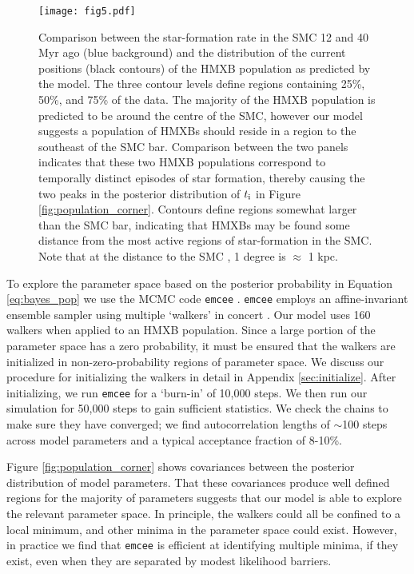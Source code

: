 \documentclass[usenatbib]{mnras}
\begin{document}
\begin{figure}
\begin{center}
\texttt{[image: fig5.pdf]}
\caption{ Comparison between the star-formation rate in the SMC 12 and 40 Myr ago (blue background) and the distribution of the current positions (black contours) of the HMXB population as predicted by the model. The three contour levels define regions containing 25\%, 50\%, and 75\% of the data. The majority of the HMXB population is predicted to be around the centre of the SMC, however our model suggests a population of HMXBs should reside in a region to the southeast of the SMC bar. Comparison between the two panels indicates that these two HMXB populations correspond to temporally distinct episodes of star formation, thereby causing the two peaks in the posterior distribution of $t_{\rm i}$ in Figure \ref{fig:population_corner}. Contours define regions somewhat larger than the SMC bar, indicating that HMXBs may be found some distance from the most active regions of star-formation in the SMC. Note that at the distance to the SMC \citep[61 pc;][]{hilditch05}, 1 degree is $\approx$ 1 kpc.}
\label{fig:population_ra_dec}
\end{center}
\end{figure}



To explore the parameter space based on the posterior probability in Equation \ref{eq:bayes_pop} we use the MCMC code {\tt emcee} \citep{foreman-mackey13}. {\tt emcee} employs an affine-invariant ensemble sampler using multiple `walkers' in concert \citep{goodman10}. Our model uses 160 walkers when applied to an HMXB population. Since a large portion of the parameter space has a zero probability, it must be ensured that the walkers are initialized in non-zero-probability regions of parameter space. We discuss our procedure for initializing the walkers in detail in Appendix \ref{sec:initialize}. After initializing, we run {\tt emcee} for a `burn-in' of 10,000 steps. We then run our simulation for 50,000 steps to gain sufficient statistics. We check the chains to make sure they have converged; we find autocorrelation lengths of $\sim$100 steps across model parameters and a typical acceptance fraction of 8-10\%. 

Figure \ref{fig:population_corner} shows covariances between the posterior distribution of model parameters. That these covariances produce well defined regions for the majority of parameters suggests that our model is able to explore the relevant parameter space. In principle, the walkers could all be confined to a local minimum, and other minima in the parameter space could exist. However, in practice we find that {\tt emcee} is efficient at identifying multiple minima, if they exist, even when they are separated by modest likelihood barriers. 
\end{document}
